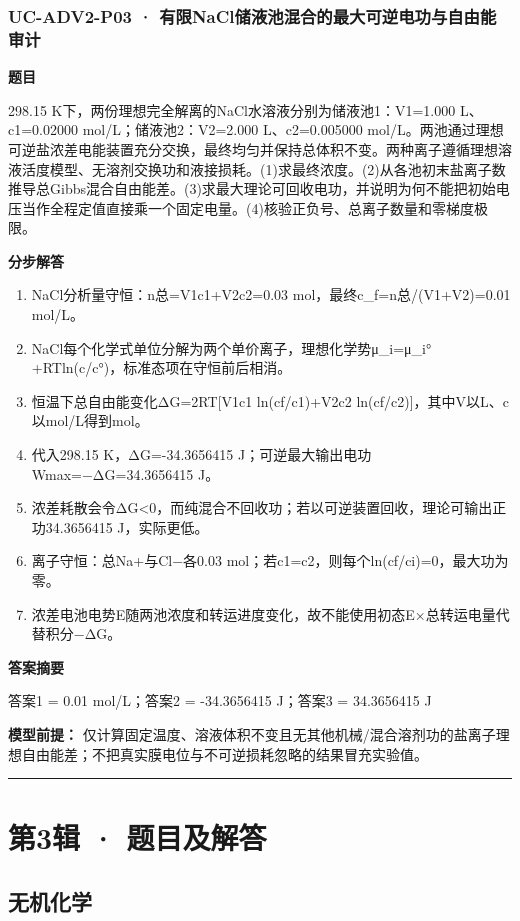 \documentclass[UTF8,11pt,a4paper]{ctexart}
\begin{document}
\subsubsection*{UC-ADV2-P03 · 有限NaCl储液池混合的最大可逆电功与自由能审计}
\noindent\textbf{题目}\par
298.15 K下，两份理想完全解离的NaCl水溶液分别为储液池1：V1=1.000 L、c1=0.02000 mol/L；储液池2：V2=2.000 L、c2=0.005000 mol/L。两池通过理想可逆盐浓差电能装置充分交换，最终均匀并保持总体积不变。两种离子遵循理想溶液活度模型、无溶剂交换功和液接损耗。(1)求最终浓度。(2)从各池初末盐离子数推导总Gibbs混合自由能差。(3)求最大理论可回收电功，并说明为何不能把初始电压当作全程定值直接乘一个固定电量。(4)核验正负号、总离子数量和零梯度极限。\par
\medskip\noindent\textbf{分步解答}
\begin{enumerate}
\item NaCl分析量守恒：n总=V1c1+V2c2=0.03 mol，最终c\_f=n总/(V1+V2)=0.01 mol/L。
\item NaCl每个化学式单位分解为两个单价离子，理想化学势μ\_i=μ\_i°+RTln(c/c°)，标准态项在守恒前后相消。
\item 恒温下总自由能变化ΔG=2RT[V1c1 ln(cf/c1)+V2c2 ln(cf/c2)]，其中V以L、c以mol/L得到mol。
\item 代入298.15 K，ΔG=-34.3656415 J；可逆最大输出电功Wmax=−ΔG=34.3656415 J。
\item 浓差耗散会令ΔG<0，而纯混合不回收功；若以可逆装置回收，理论可输出正功34.3656415 J，实际更低。
\item 离子守恒：总Na+与Cl−各0.03 mol；若c1=c2，则每个ln(cf/ci)=0，最大功为零。
\item 浓差电池电势E随两池浓度和转运进度变化，故不能使用初态E×总转运电量代替积分−ΔG。
\end{enumerate}
\noindent\textbf{答案摘要}\par
答案1 = 0.01 mol/L；答案2 = -34.3656415 J；答案3 = 34.3656415 J\par
\noindent\textbf{模型前提：}
仅计算固定温度、溶液体积不变且无其他机械/混合溶剂功的盐离子理想自由能差；不把真实膜电位与不可逆损耗忽略的结果冒充实验值。\par
\medskip\hrule\medskip
\clearpage
\section*{第3辑 · 题目及解答}
\subsection*{无机化学}
\end{document}
